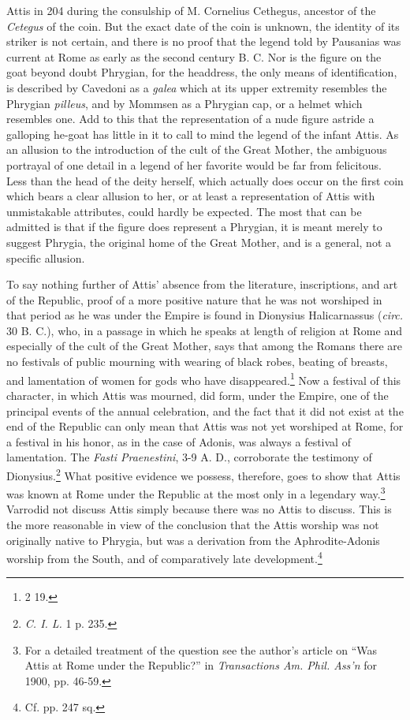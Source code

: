 \documentclass[a4paper, 11pt, oneside, polutonikogreek, english]{article}
\begin{document}
Attis in 204 during the consulship of M. Cornelius Cethegus, ancestor of the \emph{Cetegus} of the coin. But the exact date of the coin is unknown, the identity of its striker is not certain, and there is no proof that the legend told by Pausanias was current at Rome as early as the second century B. C. Nor is the figure on the goat beyond doubt Phrygian, for the headdress, the only means of identification, is described by Cavedoni as a \emph{galea} which at its upper extremity resembles the Phrygian \emph{pilleus}, and by Mommsen as a Phrygian cap, or a helmet which resembles one. Add to this that the representation of a nude figure astride a galloping he-goat has little in it to call to mind the legend of the infant Attis. As an allusion to the introduction of the cult of the Great Mother, the ambiguous portrayal of one detail in a legend of her favorite would be far from felicitous. Less than the head of the deity herself, which actually does occur on the first coin which bears a clear allusion to her, or at least a representation of Attis with unmistakable attributes, could hardly be expected. The most that can be admitted is that if the figure does represent a Phrygian, it is meant merely to suggest Phrygia, the original home of the Great Mother, and is a general, not a specific allusion.

To say nothing further of Attis' absence from the literature, inscriptions, and art of the Republic, proof of a more positive nature that he was not worshiped in that period as he was under the Empire is found in Dionysius Halicarnassus (\emph{circ.} 30 B. C.), who, in a passage in which he speaks at length of religion at Rome and especially of the cult of the Great Mother, says that among the Romans there are no festivals of public mourning with wearing of black robes, beating of breasts, and lamentation of women for gods who have disappeared.\footnote{2 19.} Now a festival of this character, in which Attis was mourned, did form, under the Empire, one of the principal events of the annual celebration, and the fact that it did not exist at the end of the Republic can only mean that Attis was not yet worshiped at Rome, for a festival in his honor, as in the case of Adonis, was always a festival of lamentation. The \emph{Fasti Praenestini}, 3-9 A. D., corroborate the testimony of Dionysius.\footnote{\emph{C. I. L.} 1 p. 235.} What positive evidence we possess, therefore, goes to show that Attis was known at Rome under the Republic at the most only in a legendary way.\footnote{For a detailed treatment of the question see the author's article on ``Was Attis at Rome under the Republic?'' in \emph{Transactions Am. Phil. Ass'n} for 1900, pp. 46-59.} Varrodid not discuss Attis simply because there was no Attis to discuss. This is the more reasonable in view of the conclusion that the Attis worship was not originally native to Phrygia, but was a derivation from the Aphrodite-Adonis worship from the South, and of comparatively late development.\footnote{Cf. pp. 247 sq.}
\end{document}
